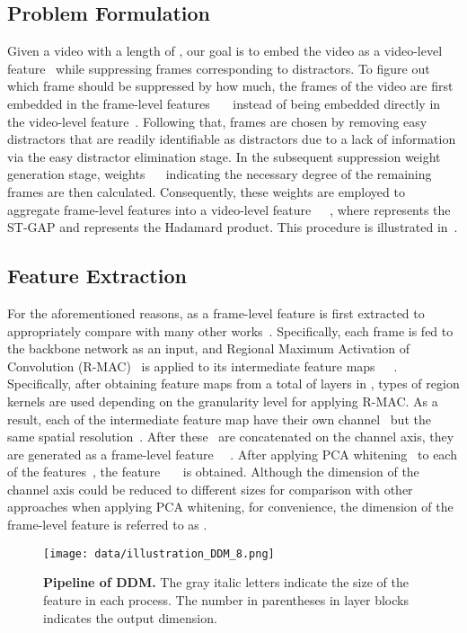 \documentclass[10pt,twocolumn,letterpaper]{article}
\begin{document}
    \subsection{Problem Formulation}
        Given a video with a length of , our goal is to embed the video as a video-level feature~ while suppressing frames corresponding to distractors. To figure out which frame should be suppressed by how much, the frames of the video are first embedded in the frame-level features~~~ instead of being embedded directly in the video-level feature~. Following that,  frames are chosen by removing easy distractors that are readily identifiable as distractors due to a lack of information via the easy distractor elimination stage. In the subsequent suppression weight generation stage, weights ~~ indicating the necessary degree of the remaining frames are then calculated. Consequently, these weights are employed to aggregate frame-level features into a video-level feature~~~, where  represents the ST-GAP and  represents the Hadamard product. This procedure is illustrated in~.

    
    \subsection{Feature Extraction}

        For the aforementioned reasons,  as a frame-level feature is first extracted to appropriately compare with many other works~\cite{kordopatis2017near, kordopatis2019visil, shao2021temporal, ng2022vrag}. Specifically, each frame is fed to the backbone network  as an input, and Regional Maximum Activation of Convolution (R-MAC)~\cite{tolias2016particular} is applied to its intermediate feature maps~~~. Specifically, after obtaining feature maps from a total of  layers in ,  types of region kernels are used depending on the granularity level for applying R-MAC. As a result, each of the  intermediate feature map  have their own channel~ but the same spatial resolution~. After these~ are concatenated on the channel axis, they are generated as a frame-level feature ~~. After applying PCA whitening~\cite{jegou2012negative} to each of the features~, the  feature~~~ is obtained. Although the dimension of the channel axis could be reduced to different sizes for comparison with other approaches when applying PCA whitening, for convenience, the dimension of the frame-level feature is referred to as .
    
    \begin{figure}[t!]     
        \centering
        \texttt{[image: data/illustration\_DDM\_8.png]} 
        \vspace{-3mm}
        \caption{\textbf{Pipeline of DDM.} The gray italic letters indicate the size of the feature in each process. The number in parentheses in layer blocks indicates the output dimension. \vspace{-4mm}} \label{fig:ddm}
    \end{figure}
    
\end{document}
